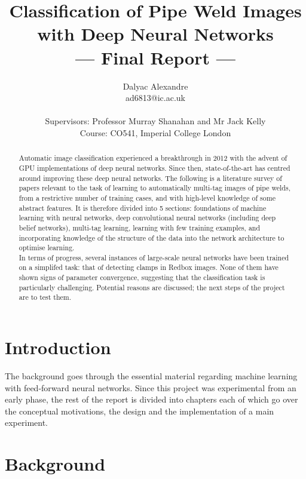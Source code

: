 \documentclass[a4paper,11pt]{article}
\title{Classification of Pipe Weld Images with Deep Neural Networks\\\Large{--- Final Report ---}}
\author{Dalyac Alexandre\\
       ad6813@ic.ac.uk\\ \\
       \small{Supervisors: Professor Murray Shanahan and Mr Jack Kelly}\\
       \small{Course: CO541, Imperial College London}
}
\begin{document}
\maketitle

\begin{abstract}

{
Automatic image classification experienced a breakthrough in 2012 with the advent of GPU implementations of deep neural networks. Since then, state-of-the-art has centred around improving these deep neural networks. The following is a literature survey of papers relevant to the task of learning to automatically multi-tag images of pipe welds, from a restrictive number of training cases, and with high-level knowledge of some abstract features. It is therefore divided into 5 sections: foundations of machine learning with neural networks, deep convolutional neural networks (including deep belief networks), multi-tag learning, learning with few training examples, and incorporating knowledge of the structure of the data into the network architecture to optimise learning.\\

In terms of progress, several instances of large-scale neural networks have been trained on a simplifed task: that of detecting clamps in Redbox images. None of them have shown signs of parameter convergence, suggesting that the classification task is particularly challenging. Potential reasons are discussed; the next steps of the project are to test them.
}
\end{abstract}

\clearpage
\tableofcontents

\clearpage

\section{Introduction}

The background goes through the essential material regarding machine learning with feed-forward neural networks. Since this project was experimental from an early phase, the rest of the report is divided into chapters each of which go over the conceptual motivations, the design and the implementation of a main experiment. \\

\section{Background}
\end{document}
